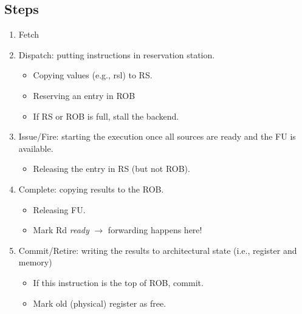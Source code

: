 \documentclass[10pt]{article}
\begin{document}
\subsection*{Steps}
\begin{enumerate}
    \item Fetch
    \item Dispatch: putting instructions in reservation station.
    \begin{itemize}
        \item Copying values (e.g., rsl) to RS.
        \item Reserving an entry in ROB
        \item If RS or ROB is full, stall the backend.
    \end{itemize}
    \item Issue/Fire: starting the execution once all sources are ready and the FU is available.
    \begin{itemize}
        \item Releasing the entry in RS (but not ROB).
    \end{itemize}
    \item Complete: copying results to the ROB.
    \begin{itemize}
        \item Releasing FU.
        \item Mark Rd \textit{ready} $\rightarrow$ forwarding happens here!
    \end{itemize}
    \item Commit/Retire: writing the results to architectural state (i.e., register and memory)
    \begin{itemize}
        \item If this instruction is the top of ROB, commit.
        \item Mark old (physical) register as free.
    \end{itemize}
\end{enumerate}
\end{document}
